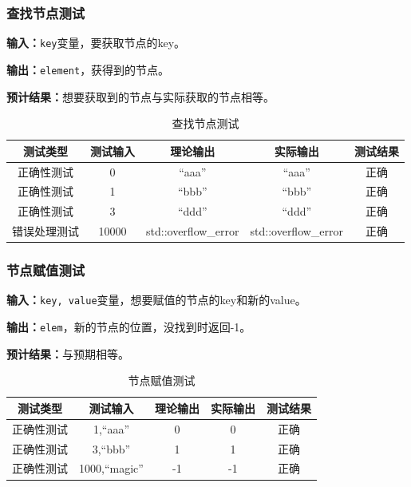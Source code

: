 \subsubsection{查找节点测试}
\textbf{输入：}\texttt{key}变量，要获取节点的key。
\par
\textbf{输出：}\texttt{element}，获得到的节点。
\par
\textbf{预计结果：}想要获取到的节点与实际获取的节点相等。
\begin{table}[Htb]
    \centering
    \caption{查找节点测试}
    \begin{tabular}{@{}ccccc@{}}
        \toprule
        \multicolumn{1}{c}{测试类型}    & \multicolumn{1}{c}{测试输入} & \multicolumn{1}{c}{理论输出} & \multicolumn{1}{c}{实际输出} &
        \multicolumn{1}{c}{测试结果} \\ \midrule
        \multicolumn{1}{c|}{正确性测试}  & 0&``aaa''&``aaa''&正确\\
        \multicolumn{1}{c|}{正确性测试}  & 1&``bbb''&``bbb''&正确\\
        \multicolumn{1}{c|}{正确性测试}  & 3&``ddd''&``ddd''&正确\\
        \multicolumn{1}{c|}{错误处理测试} & 10000& std::overflow\_error& std::overflow\_error& 正确\\ \bottomrule
    \end{tabular}
    \label{tab:gettest3}
\end{table}

\subsubsection{节点赋值测试}
\textbf{输入：}\texttt{key, value}变量，想要赋值的节点的key和新的value。
\par
\textbf{输出：}\texttt{elem}，新的节点的位置，没找到时返回-1。
\par
\textbf{预计结果：}与预期相等。
\begin{table}[Htb]
    \centering
    \caption{节点赋值测试}
    \begin{tabular}{@{}ccccc@{}}
        \toprule
        \multicolumn{1}{c}{测试类型}    & \multicolumn{1}{c}{测试输入} & \multicolumn{1}{c}{理论输出} & \multicolumn{1}{c}{实际输出} &
        \multicolumn{1}{c}{测试结果} \\ \midrule
        \multicolumn{1}{c|}{正确性测试}  & 1,``aaa''&0&0&正确\\
        \multicolumn{1}{c|}{正确性测试}  & 3,``bbb''&1&1&正确\\
        \multicolumn{1}{c|}{正确性测试}  & 1000,``magic''&-1&-1&正确\\ \bottomrule
    \end{tabular}
    \label{tab:locatetest3}
\end{table}


